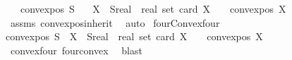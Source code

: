 \begin{isabellebody}
\ \ \ {\isachardoublequoteopen}convex{\isacharunderscore}{\kern0pt}pos\ S{\isachardoublequoteclose}\isanewline
\ \ \ {\isachardoublequoteopen}{\isasymforall}X\ {\isasymsubseteq}\ {\isacharparenleft}{\kern0pt}S{\isacharcolon}{\kern0pt}{\isacharcolon}{\kern0pt}{\isacharparenleft}{\kern0pt}real\ {\isasymtimes}\ real{\isacharparenright}{\kern0pt}\ set{\isacharparenright}{\kern0pt}{\isachardot}{\kern0pt}\ card\ X\ {\isasymle}\ {}\ {\isasymlongrightarrow}\ convex{\isacharunderscore}{\kern0pt}pos\ X{\isachardoublequoteclose}\isanewline
%
\isadelimproof
\ \ %
\endisadelimproof
%
\isatagproof
{}\isamarkupfalse%
\ assms\ convex{\isacharunderscore}{\kern0pt}pos{\isacharunderscore}{\kern0pt}inherit\ \isamarkupfalse%
\ auto%
\endisatagproof
{\isafoldproof}%
%
\isadelimproof
\isanewline
%
\endisadelimproof
\isanewline
{}\isamarkupfalse%
\ fourConvexfour{\isacharcolon}{\kern0pt}\isanewline
{\isachardoublequoteopen}convex{\isacharunderscore}{\kern0pt}pos\ S\ {\isacharequal}{\kern0pt}\ {\isacharparenleft}{\kern0pt}{\isasymforall}X\ {\isasymsubseteq}\ {\isacharparenleft}{\kern0pt}S{\isacharcolon}{\kern0pt}{\isacharcolon}{\kern0pt}{\isacharparenleft}{\kern0pt}real\ {\isasymtimes}\ real{\isacharparenright}{\kern0pt}\ set{\isacharparenright}{\kern0pt}{\isachardot}{\kern0pt}\ card\ X\ {\isasymle}\ {}\ {\isasymlongrightarrow}\ convex{\isacharunderscore}{\kern0pt}pos\ X{\isacharparenright}{\kern0pt}{\isachardoublequoteclose}\isanewline
%
\isadelimproof
\ \ %
\endisadelimproof
%
\isatagproof
{}\isamarkupfalse%
\ convexfour\ fourconvex\ \isamarkupfalse%
\ blast%
\endisatagproof
{\isafoldproof}%
%
\isadelimproof
\isanewline
%
\endisadelimproof
%
\isadelimtheory
%
\endisadelimtheory
%
\isatagtheory
{}\isamarkupfalse%
%
\endisatagtheory
{\isafoldtheory}%
%
\isadelimtheory
%
\endisadelimtheory
%
\end{isabellebody}%
\endinput
